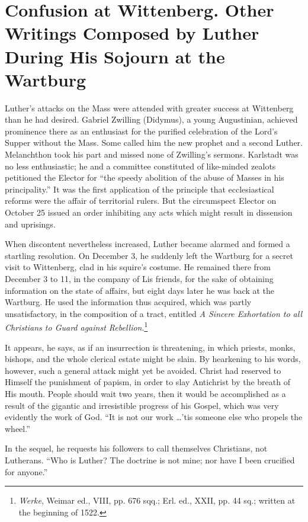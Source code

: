 \section{Confusion at Wittenberg. Other Writings Composed by Luther During His Sojourn at the Wartburg}

Luther’s attacks on the Mass were attended with greater success at
Wittenberg than he had desired. Gabriel Zwilling (Didymus), a
young Augustinian, achieved prominence there as an enthusiast for
the purified celebration of the Lord’s Supper without the Mass. Some
called him the new prophet and a second Luther. Melanchthon took
his part and missed none of Zwilling’s sermons. Karlstadt was no
less enthusiastic; he and a committee constituted of like-minded
zealots petitioned the Elector for “the speedy abolition of the abuse
of Masses in his principality.” It was the first application of the principle
that ecclesiastical reforms were the affair of territorial rulers.
But the circumspect Elector on October 25 issued an order inhibiting
any acts which might result in dissension and uprisings.

When discontent nevertheless increased, Luther became alarmed
and formed a startling resolution. On December 3, he suddenly left
the Wartburg for a secret visit to Wittenberg, clad in his squire’s
costume. He remained there from December 3 to 11, in the company of Lis
friends, for the sake of obtaining information on the state
of affairs, but eight days later he was back at the Wartburg.
He used the information thus acquired, which was partly unsatisfactory,
in the composition of a tract, entitled \textit{A Sincere Exhortation
to all Christians to Guard against Rebellion}.\footnote
{\textit{Werke}, Weimar ed., VIII, pp. 676 sqq.; Erl. ed., XXII, pp. 44 sq.; written at the
beginning of 1522.}

It appears, he says, as if an insurrection is threatening, in which priests,
monks, bishops, and the whole clerical estate might be slain. By hearkening
to his words, however, such a general attack might yet be avoided. Christ
had reserved to Himself the punishment of papism, in order to slay Antichrist
by the breath of His mouth. People should wait two years, then it
would be accomplished as a result of the gigantic and irresistible progress
of his Gospel, which was very evidently the work of God. “It is not our
work \dots ’tis someone else who propels the wheel.”

In the sequel, he requests his followers to call themselves Christians, not
Lutherans. “Who is Luther? The doctrine is not mine; nor have I been
crucified for anyone.”

